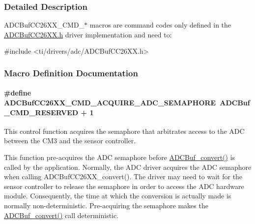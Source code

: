 \subsubsection{Detailed Description}
A\+D\+C\+Buf\+C\+C26\+X\+X\+\_\+\+C\+M\+D\+\_\+$\ast$ macros are command codes only defined in the \hyperlink{_a_d_c_buf_c_c26_x_x_8h}{A\+D\+C\+Buf\+C\+C26\+X\+X.\+h} driver implementation and need to\+: 
\begin{DoxyCode}
\textcolor{preprocessor}{#include <ti/drivers/adc/ADCBufCC26XX.h>}
\end{DoxyCode}
 

\subsubsection{Macro Definition Documentation}
\paragraph[{A\+D\+C\+Buf\+C\+C26\+X\+X\+\_\+\+C\+M\+D\+\_\+\+A\+C\+Q\+U\+I\+R\+E\+\_\+\+A\+D\+C\+\_\+\+S\+E\+M\+A\+P\+H\+O\+R\+E}]{\setlength{\rightskip}{0pt plus 5cm}\#define A\+D\+C\+Buf\+C\+C26\+X\+X\+\_\+\+C\+M\+D\+\_\+\+A\+C\+Q\+U\+I\+R\+E\+\_\+\+A\+D\+C\+\_\+\+S\+E\+M\+A\+P\+H\+O\+R\+E~{\bf A\+D\+C\+Buf\+\_\+\+C\+M\+D\+\_\+\+R\+E\+S\+E\+R\+V\+E\+D} + 1}\label{group___a_d_c_buf___c_m_d_ga0a536e47b039d0f506a4245079af247e}


This control function acquires the semaphore that arbitrates access to the A\+D\+C between the C\+M3 and the sensor controller. 

This function pre-\/acquires the A\+D\+C semaphore before \hyperlink{_a_d_c_buf_8h_a762253a94875258c5a71b591f03f9d97}{A\+D\+C\+Buf\+\_\+convert()} is called by the application. Normally, the A\+D\+C driver acquires the A\+D\+C semaphore when calling A\+D\+C\+Buf\+C\+C26\+X\+X\+\_\+convert(). The driver may need to wait for the sensor controller to release the semaphore in order to access the A\+D\+C hardware module. Consequently, the time at which the conversion is actually made is normally non-\/deterministic. Pre-\/acquiring the semaphore makes the \hyperlink{_a_d_c_buf_8h_a762253a94875258c5a71b591f03f9d97}{A\+D\+C\+Buf\+\_\+convert()} call deterministic.

